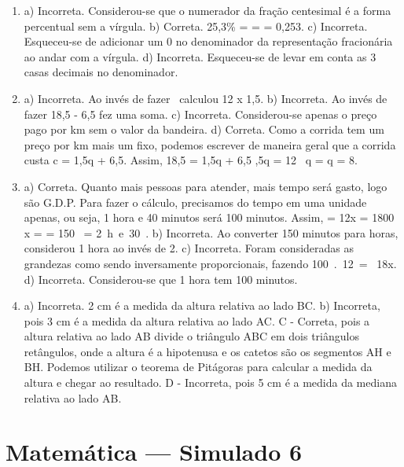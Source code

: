 \begin{enumerate}
\item a) Incorreta. Considerou-se que o numerador da fração centesimal é a forma percentual sem a vírgula.
b) Correta.
25,3\% =  =  = 0,253.
c) Incorreta. Esqueceu-se de adicionar um 0 no denominador da representação fracionária ao andar com a vírgula.
d) Incorreta. Esqueceu-se de levar em conta as 3 casas decimais no denominador.


\item a) Incorreta. Ao invés de fazer \ calculou 12 x
1,5. 
b) Incorreta. Ao invés de fazer 18,5 - 6,5 fez uma soma. 
c) Incorreta. Considerou-se apenas o preço pago por km sem o valor da bandeira. 
d) Correta. Como a corrida tem um preço por km mais um
fixo, podemos escrever de maneira geral que a corrida custa
c = 1,5q + 6,5. Assim, 18,5 = 1,5q + 6,5 ,5q = 12 \rightarrow \ q =  \rightarrow q = 8.


\item a) Correta. Quanto mais pessoas para atender, mais tempo será gasto, logo são G.D.P. Para fazer o cálculo, precisamos do tempo em uma
unidade apenas, ou seja, 1 hora e 40 minutos será 100 minutos. Assim,  =  \rightarrow 12x = 1800 \rightarrow x =  = 150\  = 2\ h\ e\ 30\ . 
b) Incorreta. Ao converter 150 minutos para horas, considerou 1 hora ao invés de 2. 
c) Incorreta. Foram consideradas as grandezas como sendo inversamente proporcionais, fazendo 100\ .\ 12\  = \ 18x. 
d) Incorreta. Considerou-se que 1 hora tem 100 minutos.


\item a) Incorreta. 2 cm é a medida da altura relativa ao lado BC.
b) Incorreta, pois 3 cm é a medida da altura relativa ao lado AC.
C - Correta, pois a altura relativa ao lado AB divide o triângulo ABC em
dois triângulos retângulos, onde a altura é a hipotenusa e os catetos
são os segmentos AH e BH. Podemos utilizar o teorema de Pitágoras para
calcular a medida da altura e chegar ao resultado.
D - Incorreta, pois 5 cm é a medida da mediana relativa ao lado AB.
\end{enumerate}

\section*{Matemática — Simulado 6} 

